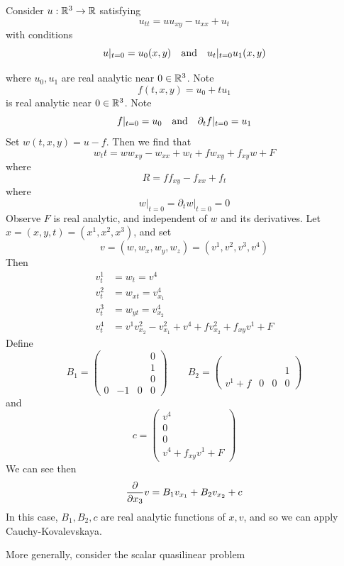 \documentclass{article}
\begin{document}
\begin{example}
    Consider \(u : \mathbb{R}^3 \to \mathbb{R}\) satisfying
    \[u_{tt} = u u_{xy} - u_{xx} + u_t\]
    with conditions
    \[u\vert_{t=0} = u_0(x, y) \qqtext{and} u_t\vert_{t=0}u_1(x, y)\]

    where \(u_0, u_1\) are real analytic near \(0 \in \mathbb{R}^3\). Note
    \[f(t, x, y) = u_0 + tu_1\]
    is real analytic near \(0 \in \mathbb{R}^3\). Note
    \[f\vert_{t=0} = u_0 \qqtext{and} \partial_tf\vert_{t=0} = u_1\]
    Set \(w(t,x,y) = u - f\). Then we find that
    \[w_tt = ww_{xy} - w_{xx} + w_t + fw_{xy} + f_{xy}w + F\]
    where
    \[R = ff_{xy} -  f_{xx} + f_t\]
    where
    \[w\vert_{t=0} = \partial_tw\vert_{t=0} = 0\]
    Observe \(F\) is real analytic, and independent of \(w\) and its derivatives. Let \(x = (x, y, t) = (x^1, x^2, x^3)\), and set
    \[v = (w, w_x, w_y, w_z) = (v^1, v^2, v^3, v^4)\]
    Then
    \begin{align*}
        v^1_t &= w_t = v^4 \\
        v_t^2 &= w_{xt} = v^4_{x_1} \\
        v_t^3 &= w_{yt} = v^4_{x_2} \\
        v_t^4 &= v^1v_{x_2}^2 - v_{x_1}^2 + v^4 + fv_{x_2}^2 + f_{xy}v^1 + F
    \end{align*}
    Define
    \[B_1 = \begin{pmatrix}
        & & & 0\\
        & & & 1 \\
        & & & 0 \\
        0 & -1 & 0 & 0
    \end{pmatrix} \qquad B_2 = \begin{pmatrix}
        & & & \\
        & & & \\
        & & & 1 \\
        v^1 + f & 0 & 0 & 0
    \end{pmatrix}\]
    and
    \[c = \begin{pmatrix}
        v^4 \\
        0 \\
        0 \\
        v^4 + f_{xy}v^1 + F
    \end{pmatrix}\]
    We can see then
    \[\pdv{x_3}v = B_1v_{x_1} + B_2v_{x_2} + c\]
    In this case, \(B_1, B_2, c\) are real analytic functions of \(x, v\), and so we can apply Cauchy-Kovalevskaya.
\end{example}

More generally, consider the scalar quasilinear problem
\end{document}
